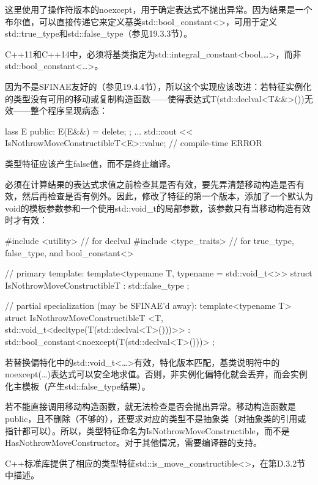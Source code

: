 这里使用了操作符版本的noexcept，用于确定表达式不抛出异常。因为结果是一个布尔值，可以直接传递它来定义基类std::bool\_constant<>，可用于定义std::true\_type和std::false\_type（参见19.3.3节）。

\begin{notice}
C++11和C++14中，必须将基类指定为std::integral\_constant<bool,…>，而非std::bool\_constant<…>。
\end{notice}

因为不是SFINAE友好的（参见19.4.4节），所以这个实现应该改进：若特征实例化的类型没有可用的移动或复制构造函数——使得表达式T(std::declval<T\&\&>())无效——整个程序呈现病态：

\begin{cpp}
lass E {
	public:
	E(E&&) = delete;
};
...
std::cout << IsNothrowMoveConstructibleT<E>::value; // compile-time ERROR
\end{cpp}

类型特征应该产生false值，而不是终止编译。

必须在计算结果的表达式求值之前检查其是否有效，要先弄清楚移动构造是否有效，然后再检查是否有例外。因此，修改了特征的第一个版本，添加了一个默认为void的模板参数参和一个使用std::void\_t的局部参数，该参数只有当移动构造有效时才有效：

\begin{cpp}
#include <utility> // for declval
#include <type_traits> // for true_type, false_type, and bool_constant<>

// primary template:
template<typename T, typename = std::void_t<>>
struct IsNothrowMoveConstructibleT : std::false_type
{
};

// partial specialization (may be SFINAE'd away):
template<typename T>
struct IsNothrowMoveConstructibleT
		<T, std::void_t<decltype(T(std::declval<T>()))>>
: std::bool_constant<noexcept(T(std::declval<T>()))>
{
};
\end{cpp}

若替换偏特化中的std::void\_t<…>有效，特化版本匹配，基类说明符中的noexcept(…)表达式可以安全地求值。否则，非实例化偏特化就会丢弃，而会实例化主模板（产生std::false\_type结果）。

若不能直接调用移动构造函数，就无法检查是否会抛出异常。移动构造函数是public，且不删除（不够的），还要求对应的类型不是抽象类（对抽象类的引用或指针都可以）。所以，类型特征命名为IsNothrowMoveConstructible，而不是HasNothrowMoveConstructor。对于其他情况，需要编译器的支持。 

C++标准库提供了相应的类型特征std::is\_move\_constructible<>，在第D.3.2节中描述。

